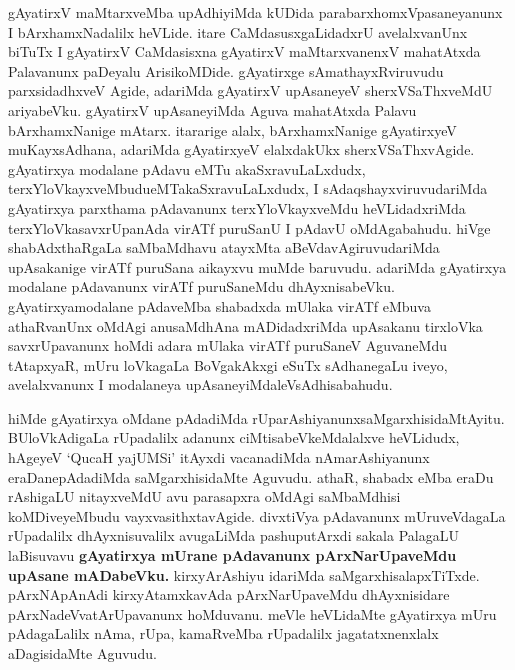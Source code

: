 \begin{artha}
gAyatirxV maMtarxveMba upAdhiyiMda kUDida parabarxhomxVpasaneyanunx I bArxhamxNadalilx heVLide. itare CaMdasusxgaLidadxrU avelalxvanUnx biTuTx  I gAyatirxV CaMdasisxna gAyatirxV maMtarxvanenxV mahatAtxda Palavanunx paDeyalu ArisikoMDide. gAyatirxge sAmathayxRviruvudu parxsidadhxveV Agide, adariMda gAyatirxV upAsaneyeV sherxVSaThxveMdU ariyabeVku. gAyatirxV upAsaneyiMda Aguva mahatAtxda Palavu bArxhamxNanige mAtarx. itararige alalx, bArxhamxNanige gAyatirxyeV muKayxsAdhana, adariMda gAyatirxyeV elalxdakUkx sherxVSaThxvAgide. gAyatirxya modalane pAdavu eMTu akaSxravuLaLxdudx, terxYloVkayxveMbudu\break eMTakaSxravuLaLxdudx, I sAdaqshayxviruvudariMda gAyatirxya parxthama pAdavanunx terxYloVkayxveMdu heVLidadxriMda terxYloVkasavxrUpanAda virATf puruSanU I pAdavU oMdAgabahudu. hiVge shabAdxthaRgaLa saMbaMdhavu atayxMta aBeVdavAgiruvudariMda upAsakanige virATf puruSana aikayxvu muMde baruvudu. adariMda gAyatirxya modalane pAdavanunx virATf puruSaneMdu dhAyxnisabeVku. gAyatirxya\break modalane pAdaveMba shabadxda mUlaka virATf eMbuva athaRvanUnx oMdAgi anusaMdhAna mADidadxriMda upAsakanu tirxloVka savxrUpavanunx hoMdi adara mUlaka virATf puruSaneV AguvaneMdu tAtapxyaR, mUru loVkagaLa BoVgakAkxgi eSuTx sAdhanegaLu iveyo, avelalxvanunx I modalaneya upAsaneyiMdaleV\break sAdhisabahudu.
\end{artha}


\begin{artha}
hiMde gAyatirxya oMdane pAdadiMda rUparAshiyanunx\break saMgarxhisidaMtAyitu. BUloVkAdigaLa rUpadalilx adanunx ciMtisabeVkeMdalalxve heVLidudx, hAgeyeV `QucaH yajUMSi' itAyxdi vacanadiMda nAmarAshiyanunx eraDanepAdadiMda saMgarxhisidaMte Aguvudu. athaR, shabadx eMba eraDu rAshigaLU nitayxveMdU avu parasapxra oMdAgi saMbaMdhisi koMDiveyeMbudu vayxvasithxtavAgide. divxtiVya pAdavanunx mUruveVdagaLa rUpadalilx dhAyxnisuvalilx avugaLiMda pashuputArxdi sakala PalagaLU laBisuvavu \textbf{gAyatirxya mUrane pAdavanunx pArxNarUpaveMdu upAsane mADabeVku.} kirxyArAshiyu idariMda saMgarxhisalapxTiTxde. pArxNApAnAdi kirxyAtamxkavAda pArxNarUpaveMdu dhAyxnisidare pArxNadeVvatArUpavanunx hoMduvanu. meVle heVLidaMte gAyatirxya mUru pAdagaLalilx nAma, rUpa, kamaRveMba rUpadalilx jagatatxnenxlalx aDagisidaMte Aguvudu.
\end{artha}


